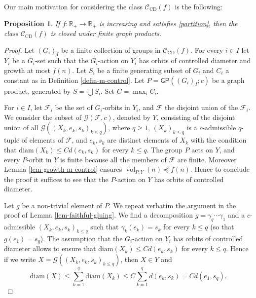 \documentclass[11pt]{amsart}
\newcommand{\R}{\ensuremath{\mathbb{R}}}%
\newcommand{\F}{\ensuremath{\mathcal{F}}}%
\newcommand{\vol}{\ensuremath{\operatorname{vol}}}%
\newcommand{\Class}{\ensuremath{\mathcal{C}}}
\theoremstyle{definition}
\theoremstyle{plain}
\newtheorem{prop}[defin]{Proposition}
\theoremstyle{remark}
\begin{document}

Our main motivation for considering the class $\Class_{\mathrm{CD}}(f)$ is the following:

\begin{prop} \label{prop-large-displ-stable}
	If $f: \R_+ \to \R_+$ is increasing and satisfies \eqref{partition}, then the class $\Class_{\mathrm{CD}}(f)$ is closed under finite graph products. 
\end{prop}

\begin{proof}
	Let $(G_i)_I$ be a finite collection of groups in $\Class_{\mathrm{CD}}(f)$. For every $i \in I$ let $Y_i$ be a $G_i$-set such that the $G_i$-action on $Y_i$ has orbits of controlled diameter and growth at most $f(n)$. Let $S_i$ be a finite generating subset of $G_i$ and $C_i$ a constant as in Definition \ref{defin-m-control}. Let $P = \mathsf{GP}((G_i)_{I}; c)$ be a graph product, generated by $S = \bigcup S_i$. Set $C = \max_i C_i$. 
	
	For $i \in I$, let $\F_i$ be the set of $G_i$-orbits in $Y_i$, and $\F$ the disjoint union of the $\F_i$. We consider the subset of $\mathcal{G}(\F,c)$, denoted by $Y$, consisting of the disjoint union of all $\mathcal{G}((X_k,e_k,s_k)_{k \leq q})$, where $q \geq 1$, $(X_k)_{k \leq q}$ is a $c$-admissible $q$-tuple of elements of $\F$, and $e_k,s_k$ are distinct elements of $X_k$ with the condition that  $\mathrm{diam}(X_k)\leq C d(e_k,s_k)$ for every $k \leq q$. The group $P$ acts on $Y$, and every $P$-orbit in $Y$ is finite because all the members of $\F$ are finite. Moreover Lemma \ref{lem-growth-m-control} ensures $\vol_{P, Y}(n) \preccurlyeq f(n)$. Hence to conclude the proof it suffices to see that the $P$-action on $Y$ has orbits of controlled diameter.
	
	Let $g$ be a non-trivial element of $P$. We repeat verbatim the argument in the proof of Lemma  \ref{lem-faithful-gluing}. We find a decomposition $g = \gamma_q \cdots \gamma_1$ and a $c$-admissible $(X_k,e_k,s_k)_{k \leq q}$ such that $\gamma_k(e_k) = s_k$ for every $k \leq q$ (so that $g(e_1) = s_q$). The assumption that the $G_i$-action on $Y_i$ has orbits of controlled diameter allows to ensure that $\mathrm{diam}(X_k) \leq C d(e_k,s_k)$ for every $k \leq q$. Hence if we write $X = \mathcal{G}((X_k,e_k,s_k)_{k \leq q})$, then $X \in Y$ and  \[ \mathrm{diam}(X) \leq \sum_{k=1}^q \mathrm{diam}(X_k) \leq C  \sum_{k=1}^qd(e_k,s_k) = C d(e_1,s_q). \] \qedhere
\end{proof}
\end{document}

